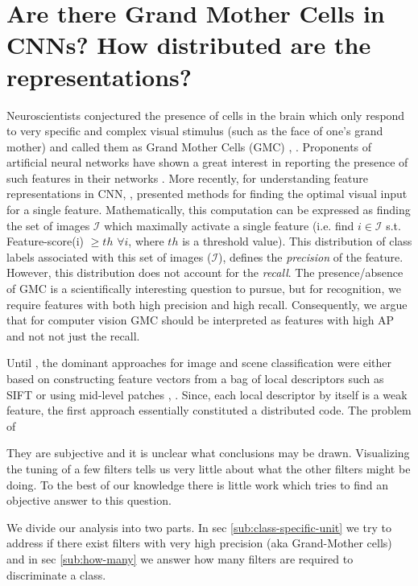 \section{Are there Grand Mother Cells in CNNs? How distributed are the representations?}
\label{sec:grand-mother}
Neuroscientists conjectured the presence of cells in the brain which only respond to very specific and complex visual stimulus (such as the face of one's grand mother) and  called them as Grand Mother Cells (GMC) \cite{Barlow}, \cite{Grandmother}. Proponents of artificial neural networks have shown a great interest in reporting the presence of such features in their networks \cite{GoogleCat}. More recently, for understanding feature representations in CNN, \cite{DeConv}, \cite{Simonyan} presented methods for finding the optimal visual input for a single feature. Mathematically, this computation can be expressed as finding the set of images $\mathcal{I}$ which maximally activate a single feature (i.e. find $i \in \mathcal{I}$ s.t. Feature-score(i) $\geq th$ $\forall i $, where $th$ is a threshold value). This distribution of class labels associated with this set of images ($\mathcal{I}$), defines the \textit{precision} of the feature. However, this distribution does not account for the \textit{recall}.  The presence/absence of GMC is a scientifically interesting question to pursue, but for recognition, we require features with both high precision and high recall. Consequently, we argue that for computer vision GMC should be interpreted as features with high AP and not not just the recall. 
 

Until \cite{Kriz}, the dominant approaches for image and scene classification were either based on constructing feature vectors from a bag of local descriptors such as SIFT \cite{SPM} or using mid-level patches \cite{Mid1}, \cite{Blocks}. Since, each local descriptor by itself is a weak feature, the first approach essentially constituted a distributed code. The problem of    

They are subjective and it is unclear what conclusions may be drawn. Visualizing the tuning of a few filters tells us very little about what the other filters might be doing. To the best of our knowledge there is little work which tries to find an objective answer to this question.

We divide our analysis into two parts. In sec \ref{sub:class-specific-unit} we try to address if there exist filters with very high precision (aka Grand-Mother cells) and in sec \ref{sub:how-many} we answer how many filters are required to discriminate a class. 

